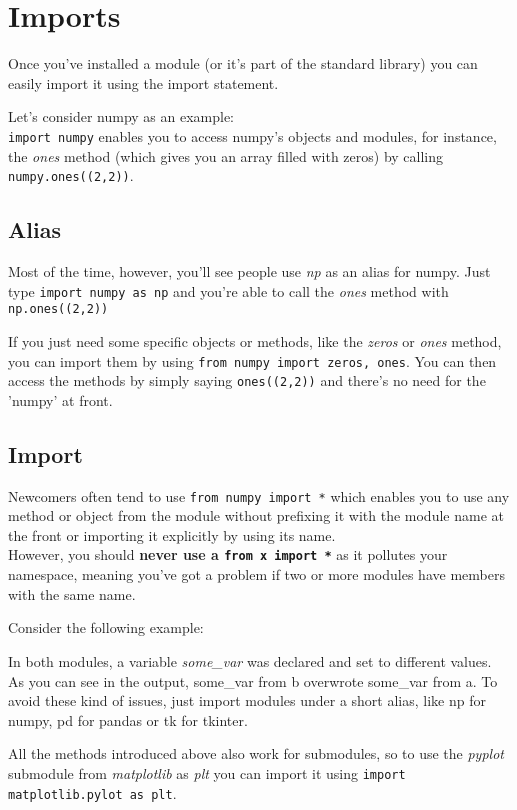 \section{Imports}

  Once you've installed a module (or it's part of the standard library) you can
  easily import it using the import statement.

  Let's consider numpy as an example:\\
  \texttt{import numpy} enables you to access numpy's objects and modules, 
  for instance, the \textit{ones} method (which gives you an array filled with zeros)
  by calling \texttt{numpy.ones((2,2))}.

  \subsection{Alias}

    Most of the time, however, you'll see people use \textit{np} as an alias for numpy.
    Just type \texttt{import numpy as np} and you're able to call the
    \textit{ones} method with \texttt{np.ones((2,2))}

    If you just need some specific objects or methods, like the \textit{zeros} or \textit{ones} method,
    you can import them by using \texttt{from numpy import zeros, ones}.
    You can then access the methods by simply saying
    \texttt{ones((2,2))} and there's no need for the 'numpy' at front.

  \subsection{Import \textasteriskcentered}

    Newcomers often tend to use \texttt{from numpy import *} which
    enables you to use any method or object from the module without prefixing
    it with the module name at the front or importing it explicitly by using its name.\\
    However, you should \textbf{never use a \texttt{from x import *}}
    as it pollutes your namespace, meaning you've got a problem if
    two or more modules have members with the same name.

    Consider the following example:

    In both modules, a variable \textit{some\_var} was declared and set to different values.
    As you can see in the output, some\_var from b overwrote some\_var from a.
    To avoid these kind of issues, just import modules under a short alias, like
    np for numpy, pd for pandas or tk for tkinter.

    All the methods introduced above also work for submodules, so to use the \textit{pyplot} submodule
    from \textit{matplotlib} as \textit{plt} you can import it using
    \texttt{import matplotlib.pylot as plt}.